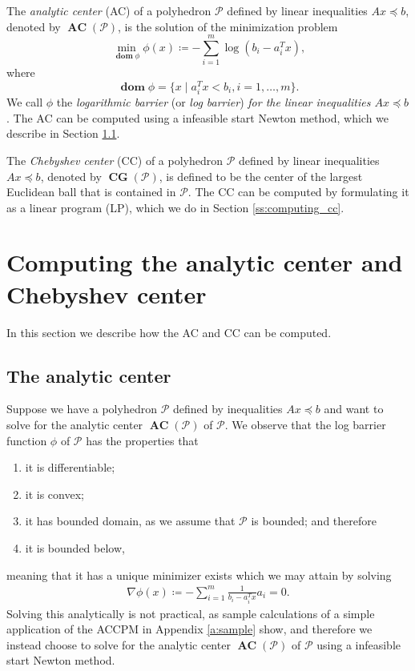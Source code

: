 \documentclass[11pt]{amsart}
\theoremstyle{definition}
\theoremstyle{remark}
\newcommand{\transpose}{T}
\DeclareMathOperator{\domain}{\textbf{dom}}
\DeclareMathOperator{\CG}{\textbf{CG}}
\DeclareMathOperator{\AC}{\textbf{AC}}
\begin{document}
        The \emph{analytic center} (AC) of a polyhedron $\mathcal{P}$ defined by linear inequalities $Ax \preceq b$, denoted by $\AC(\mathcal{P})$, is the solution of the minimization problem
        \begin{equation}\label{e:log_barrier_problem}
            \min_{\domain \phi} \phi(x) \coloneqq - \sum_{i=1}^{m}{\log{(b_i - a_i^\transpose x)}},
        \end{equation}        
        where
        \begin{equation*}
            \domain \phi = \{x \;|\; a_i^\transpose x < b_i, i = 1, \dots, m\}.
        \end{equation*}
        We call $\phi$ the \emph{logarithmic barrier} (or \emph{log barrier}) \emph{for the linear inequalities $Ax \preceq b$}. The AC can be  computed using a infeasible start Newton method, which we describe in Section \ref{ss:computing_ac}. 

        The \emph{Chebyshev center} (CC) of a polyhedron $\mathcal{P}$ defined by linear inequalities $Ax \preceq b$, denoted by $\CG(\mathcal{P})$,  is defined to be the center of the largest Euclidean ball that is contained in $\mathcal{P}$. The CC can be computed by formulating it as a linear program (LP), which we do in Section \ref{ss:computing_cc}.  


\section{Computing the analytic center and Chebyshev center}
    In this section we describe how the AC and CC can be computed.
    \subsection{The analytic center}\label{ss:computing_ac}
        Suppose we have a polyhedron $\mathcal{P}$ defined by inequalities $Ax \preceq b$ and want to solve for the analytic center $\AC(\mathcal{P})$ of $\mathcal{P}$. We observe that the log barrier function $\phi$ of $\mathcal{P}$ has the properties that 
        \begin{enumerate}
            \item it is differentiable; 
            \item it is convex;
            \item it has bounded domain, as we assume that $\mathcal{P}$ is bounded; and therefore
            \item it is bounded below, 
        \end{enumerate}
        meaning that it has a unique minimizer exists which we may attain by solving
        \begin{align*}
            \nabla \phi(x) \coloneqq - \sum_{i=1}^{m} \frac{1}{b_i - a_i^\transpose x}a_i = 0.     
        \end{align*} 
        Solving this analytically is not practical, as sample calculations of a simple application of the ACCPM in Appendix \ref{a:sample} show, and therefore we instead choose to solve for the analytic center $\AC(\mathcal{P})$ of $\mathcal{P}$ using a infeasible start Newton method. 
\end{document}
